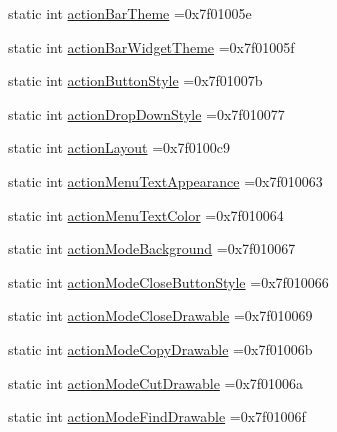 \begin{DoxyCompactItemize}
\item 
static int \hyperlink{classandroid_1_1support_1_1v7_1_1cardview_1_1R_1_1attr_a99964711ceb2ce863f537ae400002383}{action\+Bar\+Theme} =0x7f01005e
\item 
static int \hyperlink{classandroid_1_1support_1_1v7_1_1cardview_1_1R_1_1attr_a1785c41d63b19609ccdcf0b1806a98a8}{action\+Bar\+Widget\+Theme} =0x7f01005f
\item 
static int \hyperlink{classandroid_1_1support_1_1v7_1_1cardview_1_1R_1_1attr_ab251494f5d7882098a14ab434e23c38f}{action\+Button\+Style} =0x7f01007b
\item 
static int \hyperlink{classandroid_1_1support_1_1v7_1_1cardview_1_1R_1_1attr_a969d499ccb6506d8b945d61bc9df3d55}{action\+Drop\+Down\+Style} =0x7f010077
\item 
static int \hyperlink{classandroid_1_1support_1_1v7_1_1cardview_1_1R_1_1attr_a59e5c3de19788e52be3769f63ce16173}{action\+Layout} =0x7f0100c9
\item 
static int \hyperlink{classandroid_1_1support_1_1v7_1_1cardview_1_1R_1_1attr_a7783040bfbf3c10e09ddbe6af9e98989}{action\+Menu\+Text\+Appearance} =0x7f010063
\item 
static int \hyperlink{classandroid_1_1support_1_1v7_1_1cardview_1_1R_1_1attr_a0da5374357f02b6aaa09e3c863ee36dc}{action\+Menu\+Text\+Color} =0x7f010064
\item 
static int \hyperlink{classandroid_1_1support_1_1v7_1_1cardview_1_1R_1_1attr_a79984b1b7a19fe268b558f520a308f19}{action\+Mode\+Background} =0x7f010067
\item 
static int \hyperlink{classandroid_1_1support_1_1v7_1_1cardview_1_1R_1_1attr_ab744fe0cdbca0b2272aae43d708223b3}{action\+Mode\+Close\+Button\+Style} =0x7f010066
\item 
static int \hyperlink{classandroid_1_1support_1_1v7_1_1cardview_1_1R_1_1attr_a9197804bc6204b298b271ae47a72529a}{action\+Mode\+Close\+Drawable} =0x7f010069
\item 
static int \hyperlink{classandroid_1_1support_1_1v7_1_1cardview_1_1R_1_1attr_aa61ebc172827a1041ec930a83575be69}{action\+Mode\+Copy\+Drawable} =0x7f01006b
\item 
static int \hyperlink{classandroid_1_1support_1_1v7_1_1cardview_1_1R_1_1attr_a2fd9053aef5eba94d653e8a130f74f67}{action\+Mode\+Cut\+Drawable} =0x7f01006a
\item 
static int \hyperlink{classandroid_1_1support_1_1v7_1_1cardview_1_1R_1_1attr_a494f7701e17a6f850787e8abce6489ad}{action\+Mode\+Find\+Drawable} =0x7f01006f
\item 

\end{DoxyCompactItemize}
